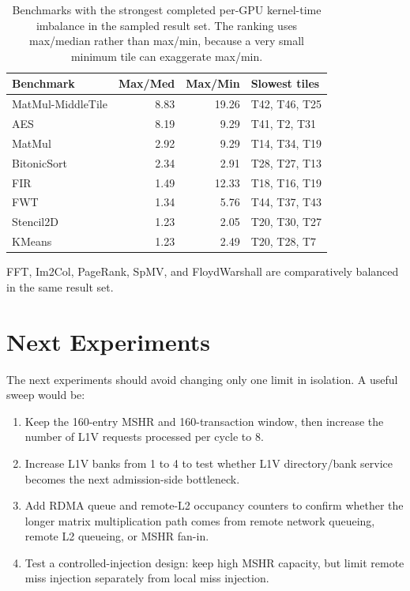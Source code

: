 \documentclass[sigconf,screen,review]{acmart}
\begin{document}
\begin{table}[t]
  \centering
  \caption{Benchmarks with the strongest completed per-GPU kernel-time
  imbalance in the sampled result set.  The ranking uses max/median rather
  than max/min, because a very small minimum tile can exaggerate max/min.}
  \label{tab:gpu-imbalance-benchmarks}
  \begin{tabular}{lrrl}
    \toprule
    Benchmark & Max/Med & Max/Min & Slowest tiles \\
    \midrule
    MatMul-MiddleTile & 8.83 & 19.26 & T42, T46, T25 \\
    AES & 8.19 & 9.29 & T41, T2, T31 \\
    MatMul & 2.92 & 9.29 & T14, T34, T19 \\
    BitonicSort & 2.34 & 2.91 & T28, T27, T13 \\
    FIR & 1.49 & 12.33 & T18, T16, T19 \\
    FWT & 1.34 & 5.76 & T44, T37, T43 \\
    Stencil2D & 1.23 & 2.05 & T20, T30, T27 \\
    KMeans & 1.23 & 2.49 & T20, T28, T7 \\
    \bottomrule
  \end{tabular}
\end{table}

FFT, Im2Col, PageRank, SpMV, and FloydWarshall are comparatively balanced in
the same result set.

\section{Next Experiments}

The next experiments should avoid changing only one limit in isolation.  A
useful sweep would be:

\begin{enumerate}
  \item Keep the 160-entry MSHR and 160-transaction window, then increase the
  number of L1V requests processed per cycle to 8.
  \item Increase L1V banks from 1 to 4 to test whether L1V directory/bank
  service becomes the next admission-side bottleneck.
  \item Add RDMA queue and remote-L2 occupancy counters to confirm whether the
  longer matrix multiplication path comes from remote network queueing, remote
  L2 queueing, or MSHR fan-in.
  \item Test a controlled-injection design: keep high MSHR capacity, but limit
  remote miss injection separately from local miss injection.
\end{enumerate}
\end{document}
